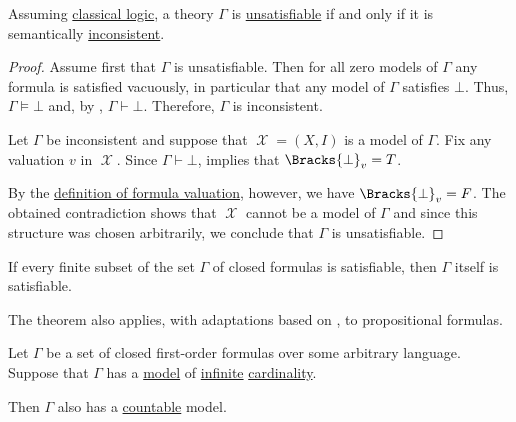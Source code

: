 \begin{proposition}\label{thm:formulas_unsatisfiable_iff_inconsistent}
   Assuming \hyperref[rem:classical_logic]{classical logic}, a theory \( \Gamma \) is \hyperref[def:propositional_model]{unsatisfiable} if and only if it is semantically \hyperref[def:first_order_theory/consistent]{inconsistent}.
\end{proposition}
\begin{proof}
  \SufficiencySubProof Assume first that \( \Gamma \) is unsatisfiable. Then for all zero models of \( \Gamma \) any formula is satisfied vacuously, in particular that any model of \( \Gamma \) satisfies \( \bot \). Thus, \( \Gamma \vDash \bot \) and, by , \( \Gamma \vdash \bot \). Therefore, \( \Gamma \) is inconsistent.

  \NecessitySubProof Let \( \Gamma \) be inconsistent and suppose that \( \mscrX = (X, I) \) is a model of \( \Gamma \). Fix any valuation \( v \) in \( \mscrX \). Since \( \Gamma \vdash \bot \),  implies that \( \Bracks{\bot}_v = T \).

  By the \hyperref[def:first_order_valuation/formula_valuation]{definition of formula valuation}, however, we have \( \Bracks{\bot}_v = F \). The obtained contradiction shows that \( \mscrX \) cannot be a model of \( \Gamma \) and since this structure was chosen arbitrarily, we conclude that \( \Gamma \) is unsatisfiable.
\end{proof}

\begin{theorem}\label{thm:first_order_compactness_theorem}
  If every finite subset of the set \( \Gamma \) of closed formulas is satisfiable, then \( \Gamma \) itself is satisfiable.
\end{theorem}
\begin{comments}
  \item The theorem also applies, with adaptations based on , to propositional formulas.
\end{comments}

\begin{theorem}\label{thm:downward_lowenheim_skolem_theorem}
  Let \( \Gamma \) be a set of closed first-order formulas over some arbitrary language. Suppose that \( \Gamma \) has a \hyperref[def:first_order_model]{model} of \hyperref[def:set_finiteness]{infinite} \hyperref[thm:cardinality_existence]{cardinality}.

  Then \( \Gamma \) also has a \hyperref[def:set_countability]{countable} model.
\end{theorem}

